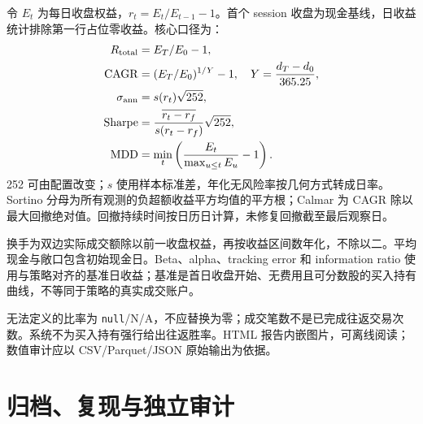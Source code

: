 \documentclass[UTF8,fontset=none,11pt]{ctexart}
\newcommand{\code}[1]{\nolinkurl{#1}}
\newcommand{\chapterpage}{\par}
\let\originalsection\section
\renewcommand{\section}{\Needspace{9\baselineskip}\originalsection}
\begin{document}
令 \(E_t\) 为每日收盘权益，\(r_t=E_t/E_{t-1}-1\)。首个 session 收盘为现金基线，日收益统计排除第一行占位零收益。核心口径为：
\begin{align*}
R_{\rm total}&=E_T/E_0-1,\\
\mathrm{CAGR}&=(E_T/E_0)^{1/Y}-1,\quad Y=\frac{d_T-d_0}{365.25},\\
\sigma_{\rm ann}&=s(r_t)\sqrt{252},\\
\mathrm{Sharpe}&=\frac{\overline{r_t-r_f}}{s(r_t-r_f)}\sqrt{252},\\
\mathrm{MDD}&=\min_t\left(\frac{E_t}{\max_{u\le t}E_u}-1\right).
\end{align*}
252 可由配置改变；\(s\) 使用样本标准差，年化无风险率按几何方式转成日率。Sortino 分母为所有观测的负超额收益平方均值的平方根；Calmar 为 CAGR 除以最大回撤绝对值。回撤持续时间按日历日计算，未修复回撤截至最后观察日。

换手为双边实际成交额除以前一收盘权益，再按收益区间数年化，不除以二。平均现金与敞口包含初始现金日。Beta、alpha、tracking error 和 information ratio 使用与策略对齐的基准日收益；基准是首日收盘开始、无费用且可分数股的买入持有曲线，不等同于策略的真实成交账户。

无法定义的比率为 \code{null}/N/A，不应替换为零；成交笔数不是已完成往返交易次数。系统不为买入持有强行给出往返胜率。HTML 报告内嵌图片，可离线阅读；数值审计应以 CSV/Parquet/JSON 原始输出为依据。

\chapterpage
\section{归档、复现与独立审计}
\end{document}
